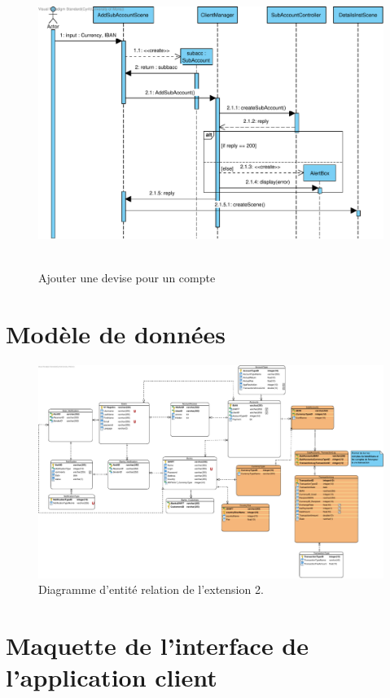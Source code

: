 \documentclass[]{report}
\begin{document}
\begin{figure}[h!]
	\hbox{
		\centering\includegraphics[width=\linewidth]{img/Sequence 6 - Extension 2.pdf}
	}
	\caption{Ajouter une devise pour un compte}
\end{figure}

\newpage

\section{Modèle de données}

\begin{figure}[h]
	\centering\includegraphics[width=\linewidth]{img/BDD - Extension 2.pdf}
	\caption{Diagramme d'entité relation de l'extension 2.}
\end{figure}


\newpage

\section{Maquette de l'interface de l'application client}
\end{document}
